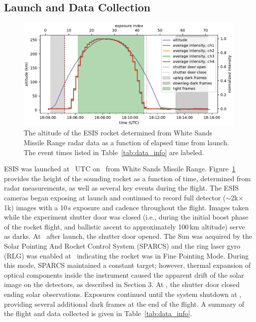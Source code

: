 	\subsection{Launch and Data Collection} 
		\begin{figure}[ht]
			\begin{center}
				\includegraphics{figures/signal_and_altitude_vs_time}
				\caption{The altitude of the ESIS rocket determined from White Sands Missile Range radar data as a function of elapsed time from launch.  The event times listed in Table~\ref{tab:data_info} are labeled.}
				\label{fig:timeline}
			\end{center}
		\end{figure}

		ESIS was launched at \timeMissionStart~UTC
		on \dateMission\ from White Sands Missile Range.  Figure~\ref{fig:timeline} provides the height of the sounding rocket as a function of time, determined from %
		radar measurements, as well as several key events during the flight.  
		The ESIS cameras began exposing at launch and continued to record full detector ($\sim$2k$\times$1k) images with a 10\,s exposure and cadence throughout the flight. Images taken while the
		experiment shutter door was closed (i.e., during the initial  boost phase of the rocket flight, and ballistic ascent to approximately 100\,km altitude) serve as darks.  
		At \timeMissionShutterOpen\ after launch, the shutter door %
		opened.  
		The Sun was acquired by the Solar Pointing And Rocket %
		Control System (SPARCS) and the ring laser gyro (RLG) was enabled at \timeMissionRlgEnable\ indicating the rocket was in Fine Pointing Mode.  
		During this mode, SPARCS maintained a constant target; however, thermal expansion of optical components inside the instrument caused the apparent drift of the solar image on the detectors, as described in Section 3.  
		At  \timeMissionShutterClose, the shutter door closed ending solar observations. Exposures continued until the system shutdown at \timeDataStop, providing several additional dark frames at the end of the flight.   A summary of the flight and data collected is given in Table~\ref{tab:data_info}.
		
